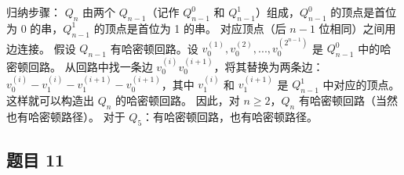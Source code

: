 \documentclass[10pt,a4paper,openany]{ctexbook}
\theoremstyle{definition}
\theoremstyle{remark}
\begin{document}
归纳步骤：
$Q_n$ 由两个 $Q_{n-1}$（记作 $Q_{n-1}^0$ 和 $Q_{n-1}^1$）组成，$Q_{n-1}^0$ 的顶点是首位为 0 的串，$Q_{n-1}^1$ 的顶点是首位为 1 的串。
对应顶点（后 $n-1$ 位相同）之间用边连接。
假设 $Q_{n-1}$ 有哈密顿回路。设 $v_0^{(1)}, v_0^{(2)}, ..., v_0^{(2^{n-1})}$ 是 $Q_{n-1}^0$ 中的哈密顿回路。
从回路中找一条边 $v_0^{(i)}v_0^{(i+1)}$，将其替换为两条边：
$v_0^{(i)}-v_1^{(i)}-v_1^{(i+1)}-v_0^{(i+1)}$，其中 $v_1^{(i)}$ 和 $v_1^{(i+1)}$ 是 $Q_{n-1}^1$ 中对应的顶点。
这样就可以构造出 $Q_n$ 的哈密顿回路。
因此，对 $n \geq 2$，$Q_n$ 有哈密顿回路（当然也有哈密顿路径）。
对于 $Q_5$：有哈密顿回路，也有哈密顿路径。
\vspace{-2pt}

\subsection{题目 11}
\end{document}
